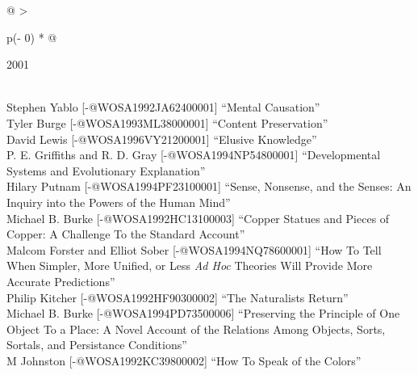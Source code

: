 \documentclass[
  10pt,
  letterpaper,
  DIV=11,
  numbers=noendperiod,
  twoside]{scrartcl}
\begin{document}
\begin{longtable}[]{@{}
  >{\raggedright\arraybackslash}p{(\columnwidth - 0\tabcolsep) * }@{}}

\caption{\label{tbl-top-ten-1992}Most cited articles published less than
ten years ago as of 2001.}

\tabularnewline

\toprule\noalign{}
\begin{minipage}[b]{\linewidth}\raggedright
2001
\end{minipage} \\
\midrule\noalign{}
\endhead
\bottomrule\noalign{}
\endlastfoot
Stephen Yablo {[}-@WOSA1992JA62400001{]} ``Mental Causation'' \\
Tyler Burge {[}-@WOSA1993ML38000001{]} ``Content Preservation'' \\
David Lewis {[}-@WOSA1996VY21200001{]} ``Elusive Knowledge'' \\
P. E. Griffiths and R. D. Gray {[}-@WOSA1994NP54800001{]}
``Developmental Systems and Evolutionary Explanation'' \\
Hilary Putnam {[}-@WOSA1994PF23100001{]} ``Sense, Nonsense, and the
Senses: An Inquiry into the Powers of the Human Mind'' \\
Michael B. Burke {[}-@WOSA1992HC13100003{]} ``Copper Statues and Pieces
of Copper: A Challenge To the Standard Account'' \\
Malcom Forster and Elliot Sober {[}-@WOSA1994NQ78600001{]} ``How To Tell
When Simpler, More Unified, or Less \emph{Ad Hoc} Theories Will Provide
More Accurate Predictions'' \\
Philip Kitcher {[}-@WOSA1992HF90300002{]} ``The Naturalists Return'' \\
Michael B. Burke {[}-@WOSA1994PD73500006{]} ``Preserving the Principle
of One Object To a Place: A Novel Account of the Relations Among
Objects, Sorts, Sortals, and Persistance Conditions'' \\
M Johnston {[}-@WOSA1992KC39800002{]} ``How To Speak of the Colors'' \\

\end{longtable}
\end{document}
